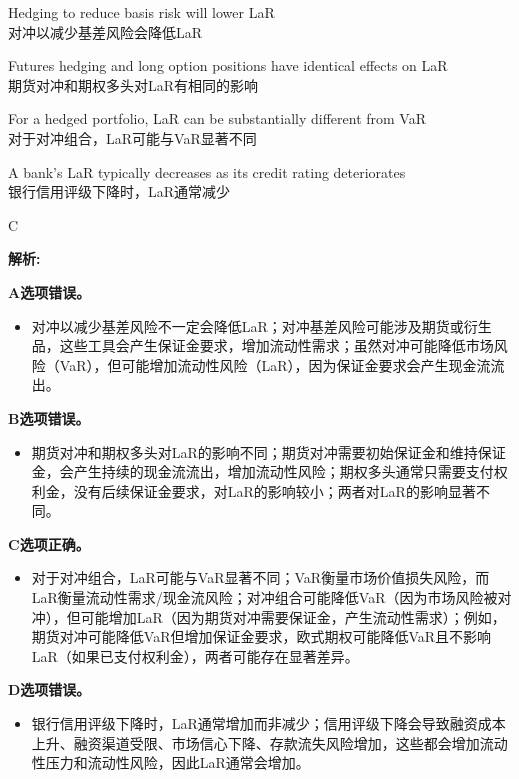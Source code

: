 \documentclass{article}
\newenvironment{explanation}
{\textbf{解析:}\par}
{\par}
\begin{document}
\begin{choices}
    \item Hedging to reduce basis risk will lower LaR\\
    对冲以减少基差风险会降低LaR
    \item Futures hedging and long option positions have identical effects on LaR\\
    期货对冲和期权多头对LaR有相同的影响
    \item For a hedged portfolio, LaR can be substantially different from VaR\\
    对于对冲组合，LaR可能与VaR显著不同
    \item A bank's LaR typically decreases as its credit rating deteriorates\\
    银行信用评级下降时，LaR通常减少
\end{choices}

\begin{correctanswer}
    C
\end{correctanswer}

\begin{explanation}
    \textbf{A选项错误。}
    \begin{itemize}
        \item 对冲以减少基差风险不一定会降低LaR；对冲基差风险可能涉及期货或衍生品，这些工具会产生保证金要求，增加流动性需求；虽然对冲可能降低市场风险（VaR），但可能增加流动性风险（LaR），因为保证金要求会产生现金流流出。
    \end{itemize}

    \textbf{B选项错误。}
    \begin{itemize}
        \item 期货对冲和期权多头对LaR的影响不同；期货对冲需要初始保证金和维持保证金，会产生持续的现金流流出，增加流动性风险；期权多头通常只需要支付权利金，没有后续保证金要求，对LaR的影响较小；两者对LaR的影响显著不同。
    \end{itemize}

    \textbf{C选项正确。}
    \begin{itemize}
        \item 对于对冲组合，LaR可能与VaR显著不同；VaR衡量市场价值损失风险，而LaR衡量流动性需求/现金流风险；对冲组合可能降低VaR（因为市场风险被对冲），但可能增加LaR（因为期货对冲需要保证金，产生流动性需求）；例如，期货对冲可能降低VaR但增加保证金要求，欧式期权可能降低VaR且不影响LaR（如果已支付权利金），两者可能存在显著差异。
    \end{itemize}

    \textbf{D选项错误。}
    \begin{itemize}
        \item 银行信用评级下降时，LaR通常增加而非减少；信用评级下降会导致融资成本上升、融资渠道受限、市场信心下降、存款流失风险增加，这些都会增加流动性压力和流动性风险，因此LaR通常会增加。
    \end{itemize}
\end{explanation}
\end{document}
